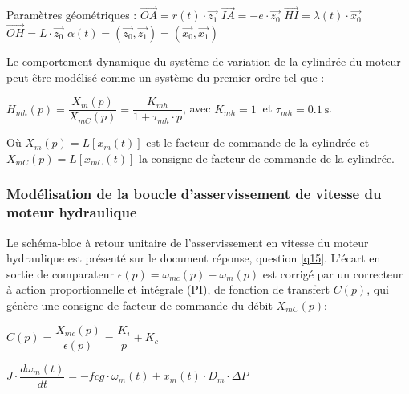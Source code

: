 Paramètres géométriques :
$\overrightarrow{OA}=r(t)\cdot\vec{z_1}$ \hfill
$\overrightarrow{IA}=-e\cdot\vec{z_0}$ \hfill
$\overrightarrow{HI}=\lambda(t)\cdot\vec{x_0}$ \hfill
$\overrightarrow{OH}=L\cdot\vec{z_0}$ \hfill
$\alpha(t)=(\vec{z_0},\vec{z_1})=(\vec{x_0},\vec{x_1})$



\newpage

Le comportement dynamique du système de variation de la cylindrée du moteur peut être modélisé comme un système du premier ordre tel que :
\begin{center}
$H_{mh}(p)=\dfrac{X_m(p)}{X_{mC}(p)}=\dfrac{K_{mh}}{1+\tau_{mh}\cdot p}$, avec $K_{mh}=\SI{1}{}$ et $\tau_{mh}=\SI{0,1}{\s}$.
\end{center}

Où $X_m(p)=L[x_m(t)]$ est le facteur de commande de la cylindrée et $X_{mC}(p)=L[x_{mC}(t)]$ la consigne de facteur de commande de la cylindrée.

\subsubsection{Modélisation de la boucle d'asservissement de vitesse du moteur hydraulique}

Le schéma-bloc à retour unitaire de l'asservissement en vitesse du moteur hydraulique est présenté sur le document réponse, question \ref{q15}. L'écart en sortie de comparateur $\epsilon(p)=\omega_{mc}(p)-\omega_{m}(p)$ est corrigé par un correcteur à action proportionnelle et intégrale (PI), de fonction de transfert $C(p)$, qui génère une consigne de facteur de commande du débit $X_{mC}(p)$:
\begin{center}
$C(p)=\dfrac{X_{mc}(p)}{\epsilon(p)}=\dfrac{K_i}{p}+K_c$
\end{center}

\begin{center}
$J\cdot\dfrac{d\omega_m(t)}{dt}=-f{cg}\cdot\omega_m(t)+x_m(t)\cdot D_m\cdot\Delta P$
\end{center}

\newpage


